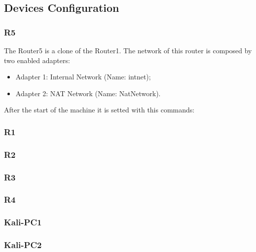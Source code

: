 \subsection{Devices Configuration}

\subsubsection*{R5}
The Router5 is a clone of the Router1.
The network of this router is composed by two enabled adapters:
\begin{itemize}
	\item Adapter 1: Internal Network (Name: intnet);
	\item Adapter 2: NAT Network (Name: NatNetwork).
\end{itemize}
After the start of the machine it is setted with this commands:



\subsubsection*{R1}


\subsubsection*{R2}


\subsubsection*{R3}


\subsubsection*{R4}


\subsubsection*{Kali-PC1}

%

\subsubsection*{Kali-PC2}

%

